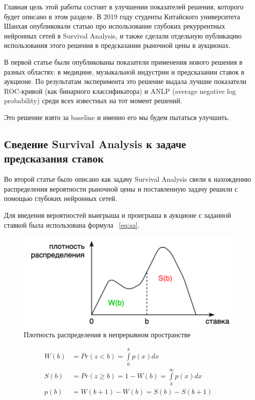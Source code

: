 \documentclass[times,specification,annotation]{itmo-student-thesis}
\begin{document}
Главная цель этой работы состоит в улучшении показателей решения, которого будет описано в этом разделе.
В 2019 году студенты Китайского университета Шанхая опубликовали статью про использование глубоких рекуррентных нейронных сетей в Survival Analysis, 
и также сделали отдельную публикацию использования этого решения в предсказании рыночной цены в аукционах.

В первой статье были опубликованы показатели применения нового решения в разных областях: 
в медицине, музыкальной индустрии и предсказании ставок в аукционе. 
По результатам эксперимента это решение выдала лучшие показатели ROC-кривой (как бинарного классификатора) и 
ANLP (average negative log probability) среди всех известных на тот момент решений.

Это решение взято за baseline и именно его мы будем пытаться улучшить.

\subsection{Сведение Survival Analysis к задаче предсказания ставок}

Во второй статье было описано как задачу Survival Analysis свели к нахождению распределения вероятности рыночной цены 
и поставленную задачу решили с помощью глубоких нейронных сетей.

Для введения вероятностей выигрыша и проигрыша в аукционе 
с заданной ставкой была использована формула ~\ref{eq:sa}.

\begin{figure}[h]
    \caption{Плотность распределения в непрерывном пространстве}
    \centering
    \includegraphics{w_s_curve.png}
\end{figure}

\begin{equation}
    \begin{split}
        W(b) & = Pr(z < b) = \int\limits_{0}^b p(x) dx \\
        S(b) & = Pr(z \geq b) = 1 - W(b) = \int\limits_{b}^{\infty} p(x) dx \\
        p(b) & = W(b + 1) - W(b) = S(b) - S(b + 1)            
    \end{split}
\end{equation}
\end{document}

